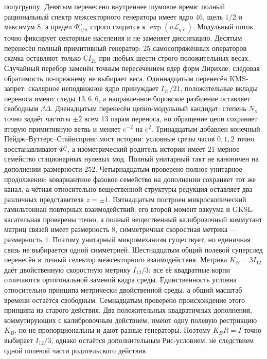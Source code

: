 полугруппу.
Девятым перенесено внутреннее шумовое время: полный рациональный спектр
межсекторного генератора имеет ядро $46$, щель $1/2$ и максимум $8$, а предел
$\Phi_{u/n}^n$ строго сходится к $\exp(u\mathcal L_{q\ell})$. Модульный поток
точно фиксирует секторные населения и не заменяет диссипацию.
Десятым перенесён полный примитивный генератор: $25$ самосопряжённых
операторов скачка оставляют только $\mathbb CI_{21}$ при любых шести строго
положительных весах. Случайный перебор заменён точным пересечением ядер форм
Дирихле; следовая обратимость по-прежнему не выбирает веса.
Одиннадцатым перенесён KMS-запрет: скалярное неподвижное ядро принуждает
$I_{21}/21$, положительные вклады переноса имеют следы $13,6,6$, а
направленное боровское разбиение оставляет свободным $\beta\Delta$.
Двенадцатым перенесён цепно-модульный кандидат: степень $N_\partial$
точно задаёт частоты $\pm2$ всем 13 парам переноса, но обращение цепи
сохраняет вторую примитивную ветвь и меняет $e^{-2}$ на $e^2$.
Тринадцатым добавлен конечный Пейдж--Вуттерс--Стайнспринг мост истории:
условные срезы часов $0,1,2$ точно восстанавливают $\Phi_*^n$, а
изометрический родитель истории имеет 21-мерное семейство стационарных
нулевых мод. Полный унитарный такт не каноничен на дополнении размерности
$252$.
Четырнадцатым проверено полное унитарное продолжение: ковариантное
фазовое семейство на дополнении сохраняет тот же канал, а чётная относительно вещественной структуры
редукция оставляет два различных представителя $z=\pm1$.
Пятнадцатым построен микроскопический гамильтониан повторных взаимодействий:
его второй момент вакуума и GKSL-касательная проверены точно, а полный
вещественный калибровочный коммутант матриц связей имеет размерность $8$,
симметричная скоростная метрика --- размерность $4$. Поэтому унитарный
микромеханизм существует, но единичная связь не выбирается одной симметрией.
Шестнадцатым общий полевой суперслед перенесён в точный селектор
межсекторного взаимодействия. Метрика $K_B=3I_{12}$ даёт двойственную скоростную метрику
$I_{12}/3$; все её квадратные корни отличаются ортогональной заменой кадра
среды. Единственность условна относительно принципа метрически двойственной
среды, а общий масштаб времени остаётся свободным.
Семнадцатым проверено происхождение этого принципа из старого действия.
Два положительных квадратичных дополнения, коммутирующих с калибровочным действием, имеют одну полевую
рестрикцию $K_B$, но не пропорциональны и дают разные генераторы. Поэтому
$K_BR=I$ точно выбирает $I_{12}/3$, однако остаётся дополнительным
Рис-условием, не следствием одной полевой части родительского действия.
